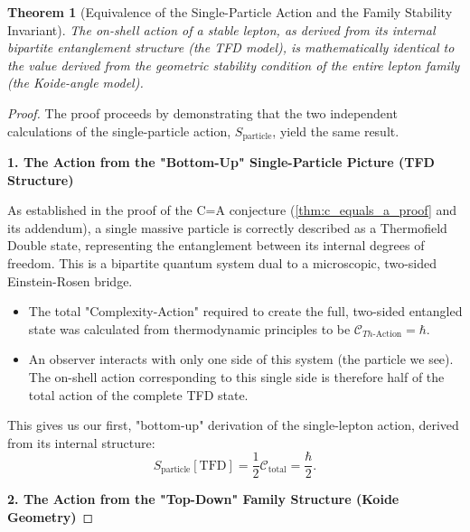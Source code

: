 \documentclass[11pt, letterpaper]{report}
\theoremstyle{plain} %
\newtheorem{theorem}{Theorem}[chapter]
\theoremstyle{definition} %
\theoremstyle{remark} %
\begin{document}
\begin{theorem}[Equivalence of the Single-Particle Action and the Family Stability Invariant]
\label{thm:action_stability_equivalence}
The on-shell action of a stable lepton, as derived from its internal bipartite entanglement structure (the TFD model), is mathematically identical to the value derived from the geometric stability condition of the entire lepton family (the Koide-angle model).
\end{theorem}
\begin{proof}
The proof proceeds by demonstrating that the two independent calculations of the single-particle action, $S_{\text{particle}}$, yield the same result.

\textbf{1. The Action from the "Bottom-Up" Single-Particle Picture (TFD Structure)}

As established in the proof of the C=A conjecture (\cref{thm:c_equals_a_proof} and its addendum), a single massive particle is correctly described as a Thermofield Double state, representing the entanglement between its internal degrees of freedom. This is a bipartite quantum system dual to a microscopic, two-sided Einstein-Rosen bridge.
\begin{itemize}
    \item The total "Complexity-Action" required to create the full, two-sided entangled state was calculated from thermodynamic principles to be $\mathcal{C}_{Th\text{-Action}} = \hbar$.
    \item An observer interacts with only one side of this system (the particle we see). The on-shell action corresponding to this single side is therefore half of the total action of the complete TFD state.
\end{itemize}
This gives us our first, "bottom-up" derivation of the single-lepton action, derived from its internal structure:
\begin{equation}
    S_{\text{particle}}[\text{TFD}] = \frac{1}{2}\mathcal{C}_{\text{total}} = \frac{\hbar}{2}.
    \label{eq:action_from_tfd}
\end{equation}

\textbf{2. The Action from the "Top-Down" Family Structure (Koide Geometry)}


\end{proof}
\end{document}
